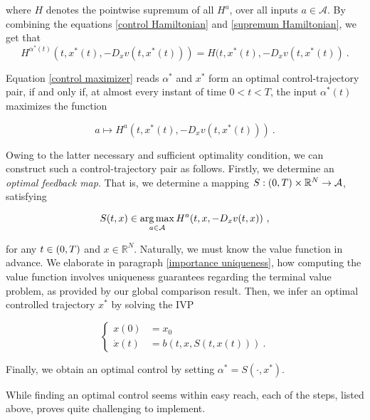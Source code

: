 where $ H $ denotes the pointwise supremum of all $ H^{a} $, over all inputs $ a \in \mathcal{A} $. By combining the equations \eqref{control Hamiltonian} and \eqref{supremum Hamiltonian}, we get that
\begin{equation}
\label{control maximizer}
	H^{\alpha^{*}(t)}(t, x^{*}(t), -D_x v(t, x^{*}(t))) = H(t, x^{*}(t), -D_x v(t, x^{*}(t)) \ .
\end{equation}

Equation \eqref{control maximizer} reads $ \alpha^* $ and $ x^* $ form an optimal control-trajectory pair, if and only if, at almost every instant of time $ 0 < t < T $, the input $ \alpha^{*}(t) $ maximizes the function

\begin{equation*}
	a \mapsto H^{a}(t, x^{*}(t), -D_x v(t, x^{*}(t))) \ .
\end{equation*}

Owing to the latter necessary and sufficient optimality condition, we can construct such a control-trajectory pair as follows. Firstly, we determine an \emph{optimal feedback map}. That is, we determine a mapping $ S : \left(0, T\right) \times \mathbb{R}^N \to \mathcal{A} $, satisfying

\begin{equation*}
	S(t, x) \in \operatorname*{arg\,max}_{a \in \mathcal{A}} H^{a}(t, x, -D_x v(t, x)) \ ,
\end{equation*}

for any $ t \in \left(0, T\right) $ and $ x \in \mathbb{R}^N $. Naturally, we must know the value function in advance. We elaborate in paragraph \ref{importance uniqueness}, how computing the value function involves uniqueness guarantees regarding the terminal value problem, as provided by our global comparison result. Then, we infer an optimal controlled trajectory $ x^{*} $ by solving the IVP

\begin{equation}
\label{feedback IVP}
	\begin{cases}
	x(0) &= x_0 \\
	\dot{x}(t) &= b(t, x, S(t, x(t))) \ .
	\end{cases}
\end{equation}

Finally, we obtain an optimal control by setting $ \alpha^{*} = S(\cdot, x^{*}) $. 

While finding an optimal control seems within easy reach, each of the steps, listed above, proves quite challenging to implement.

